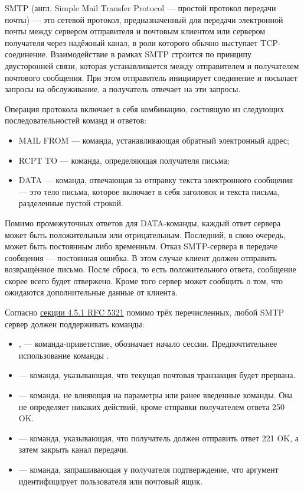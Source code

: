 SMTP (англ. Simple Mail Transfer Protocol --- простой протокол передачи почты) --- это сетевой протокол, предназначенный для передачи электронной почты между сервером отправителя и почтовым клиентом или сервером получателя через надёжный канал, в роли которого обычно выступает TCP-соединение.
Взаимодействие в рамках SMTP строится по принципу двусторонней связи, которая устанавливается между отправителем и получателем почтового сообщения. При этом отправитель инициирует соединение и посылает запросы на обслуживание, а получатель отвечает на эти запросы.

Операция протокола включает в себя комбинацию, состоящую из следующих последовательностей команд и ответов:

\begin{itemize}
	\item MAIL FROM --- команда, устанавливающая обратный электронный адрес;
	\item RCPT TO --- команда, определяющая получателя письма;
	\item DATA --- команда, отвечающая за отправку текста электронного сообщения --- это тело письма, которое включает в себя заголовок и текста письма, разделенные пустой строкой.
\end{itemize}

Помимо промежуточных ответов для DATA-команды, каждый ответ сервера может быть положительным или отрицательным. Последний, в свою очередь, может быть постоянным либо временным. Отказ SMTP-сервера в передаче сообщения --- постоянная ошибка. В этом случае клиент должен отправить возвращённое письмо.
После сброса, то есть положительного ответа, сообщение скорее всего будет отвержено. Кроме того сервер может сообщить о том, что ожидаются дополнительные данные от клиента.

Согласно \href{https://tools.ietf.org/html/rfc5321#section-4.5.1}{секции 4.5.1 RFC 5321} помимо трёх перечисленных, любой SMTP сервер должен поддерживать команды:
\begin{itemize}
	\item {},  — команда-приветствие, обозначает начало сессии.
	Предпочтительнее использование команды .
	\item {} --- команда, указывающая, что текущая почтовая транзакция будет прервана.
	\item {} --- команда, не влияющая на параметры или ранее введенные команды. Она не определяет никаких действий, кроме отправки получателем ответа 250 OK.
	\item {} --- команда, указывающая, что получатель должен отправить ответ 221 OK, а затем закрыть канал передачи.
	\item {} --- команда, запрашивающая у получателя подтверждение, что аргумент идентифицирует пользователя или почтовый ящик.
\end{itemize}

